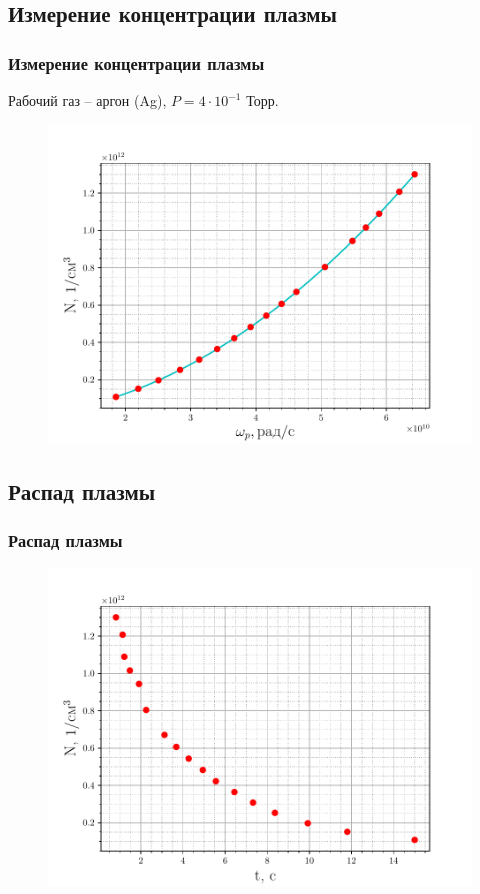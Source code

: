 \documentclass[10pt,pdf,hyperref={unicode}, dvipsnames]{beamer}
\begin{document}
\subsection{Измерение концентрации плазмы}
\begin{frame}
	\frametitle{Измерение концентрации плазмы}
	Рабочий газ -- аргон (Ag), 
	$P=4\cdot10^{-1}$ Торр. 
	\begin{figure}[tb]
		\vspace{-5pt}
		\centering
		\includegraphics[width=0.89\linewidth]{fig/concentration}
		\label{fig:1}
	\end{figure}
\end{frame}
\subsection{Распад  плазмы}
\begin{frame}
	\frametitle{Распад плазмы}
	\begin{figure}[tb]
		\centering
		\includegraphics[width=0.9\linewidth]{fig/decay}
		\label{fig:2}
	\end{figure}
\end{frame}
\end{document}
